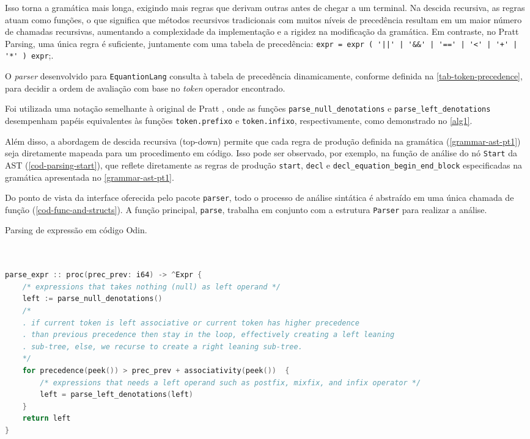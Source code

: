 Isso torna a gramática mais longa, exigindo mais regras que derivam outras antes de chegar a um terminal. Na descida recursiva, as regras atuam como funções, o que significa que métodos recursivos tradicionais com muitos níveis de precedência resultam em um maior número de chamadas recursivas, aumentando a complexidade da implementação e a rigidez na modificação da gramática. Em contraste, no Pratt Parsing, uma única regra é suficiente, juntamente com uma tabela de precedência: \verb"expr = expr ( '||' | '&&' | '==' | '<' | '+' | '*' ) expr";.

O \textit{parser} desenvolvido para \texttt{EquantionLang} consulta à tabela de precedência dinamicamente, conforme definida na \autoref{tab-token-precedence}, para decidir a ordem de avaliação com base no \textit{token} operador encontrado.


Foi utilizada uma notação semelhante à original de Pratt \cite{pratt}, onde as funções \verb"parse_null_denotations" e \verb"parse_left_denotations" desempenham papéis equivalentes às funções \texttt{token.prefixo} e \texttt{token.infixo}, respectivamente, como demonstrado no \autoref{alg1}. 

Além disso, a abordagem de descida recursiva (top-down) permite que cada regra de produção definida na gramática (\autoref{grammar-ast-pt1}) seja diretamente mapeada para um procedimento em código. Isso pode ser observado, por exemplo, na função de análise do nó \texttt{Start} da AST (\autoref{cod-parsing-start}), que reflete diretamente as regras de produção \texttt{start}, \texttt{decl} e \verb"decl_equation_begin_end_block" especificadas na gramática apresentada no \autoref{grammar-ast-pt1}.

Do ponto de vista da interface oferecida pelo pacote \texttt{parser}, todo o processo de análise sintática é abstraído em uma única chamada de função (\autoref{cod-func-and-structs}). A função principal, \texttt{parse}, trabalha em conjunto com a estrutura \texttt{Parser} para realizar a análise.

\begin{codigo}[H]
  \caption{\small Parsing de expressão em código Odin.}
        \label{alg-pratt-parsing}
  \begin{lstlisting}[language=C]


parse_expr :: proc(prec_prev: i64) -> ^Expr {
    /* expressions that takes nothing (null) as left operand */
    left := parse_null_denotations()
    /*
    . if current token is left associative or current token has higher precedence
    . than previous precedence then stay in the loop, effectively creating a left leaning
    . sub-tree, else, we recurse to create a right leaning sub-tree.
    */
    for precedence(peek()) > prec_prev + associativity(peek())  {
        /* expressions that needs a left operand such as postfix, mixfix, and infix operator */
        left = parse_left_denotations(left)
    }
    return left
}


  \end{lstlisting}
\end{codigo}

